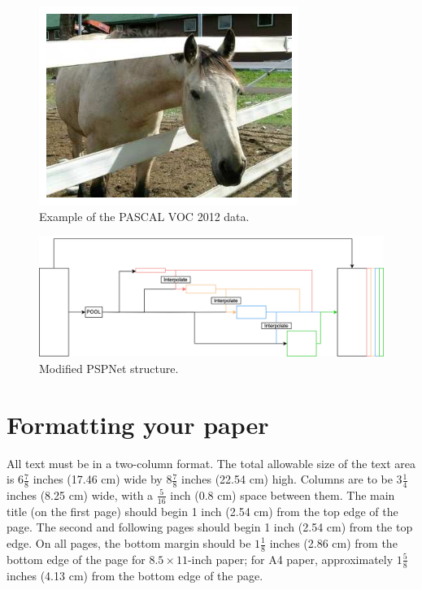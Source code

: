 \documentclass[10pt,twocolumn,letterpaper]{article}
\begin{document}
\begin{figure}
  \centering
  \includegraphics[width=\linewidth]{figures/PASCAL_VOC_horse.png}
  \caption{Example of the PASCAL VOC 2012 data.}
  \label{fig:PASCAL_VOC_horse}
\end{figure}


\begin{figure}[h]
  \centering
  \includegraphics[width=\linewidth]{figures/PSPNet_modified.jpg}
  \caption{Modified PSPNet structure.}
  \label{fig:PSPNet_modified}
\end{figure}

\section{Formatting your paper}
\label{sec:formatting}

All text must be in a two-column format.
The total allowable size of the text area is $6\frac78$ inches (17.46 cm) wide by $8\frac78$ inches (22.54 cm) high.
Columns are to be $3\frac14$ inches (8.25 cm) wide, with a $\frac{5}{16}$ inch (0.8 cm) space between them.
The main title (on the first page) should begin 1 inch (2.54 cm) from the top edge of the page.
The second and following pages should begin 1 inch (2.54 cm) from the top edge.
On all pages, the bottom margin should be $1\frac{1}{8}$ inches (2.86 cm) from the bottom edge of the page for $8.5 \times 11$-inch paper;
for A4 paper, approximately $1\frac{5}{8}$ inches (4.13 cm) from the bottom edge of the
page.
\end{document}
